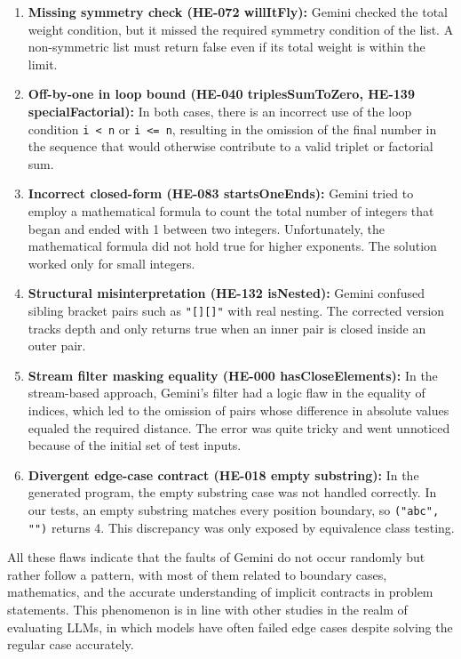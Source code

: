 \documentclass[journal]{IEEEtran}
\begin{document}
\begin{enumerate}
    \item \textbf{Missing symmetry check (HE-072 willItFly):} Gemini checked the total weight condition, but it missed the required symmetry condition of the list. A non-symmetric list must return false even if its total weight is within the limit.
    \item \textbf{Off-by-one in loop bound (HE-040 triplesSumToZero, HE-139 specialFactorial):} In both cases, there is an incorrect use of the loop condition \texttt{i < n} or \texttt{i <= n}, resulting in the omission of the final number in the sequence that would otherwise contribute to a valid triplet or factorial sum.
    \item \textbf{Incorrect closed-form (HE-083 startsOneEnds):} Gemini tried to employ a mathematical formula to count the total number of integers that began and ended with 1 between two integers. Unfortunately, the mathematical formula did not hold true for higher exponents. The solution worked only for small integers.
    \item \textbf{Structural misinterpretation (HE-132 isNested):} Gemini confused sibling bracket pairs such as \texttt{"[][]"} with real nesting. The corrected version tracks depth and only returns true when an inner pair is closed inside an outer pair.
    \item \textbf{Stream filter masking equality (HE-000 hasCloseElements):} In the stream-based approach, Gemini’s filter had a logic flaw in the equality of indices, which led to the omission of pairs whose difference in absolute values equaled the required distance. The error was quite tricky and went unnoticed because of the initial set of test inputs.
    \item \textbf{Divergent edge-case contract (HE-018 empty substring):} In the generated program, the empty substring case was not handled correctly. In our tests, an empty substring matches every position boundary, so \texttt{("abc", "")} returns 4. This discrepancy was only exposed by equivalence class testing.
\end{enumerate}

All these flaws indicate that the faults of Gemini do not occur randomly but rather follow a pattern, with most of them related to boundary cases, mathematics, and the accurate understanding of implicit contracts in problem statements. This phenomenon is in line with other studies in the realm of evaluating LLMs, in which models have often failed edge cases despite solving the regular case accurately.
\end{document}
